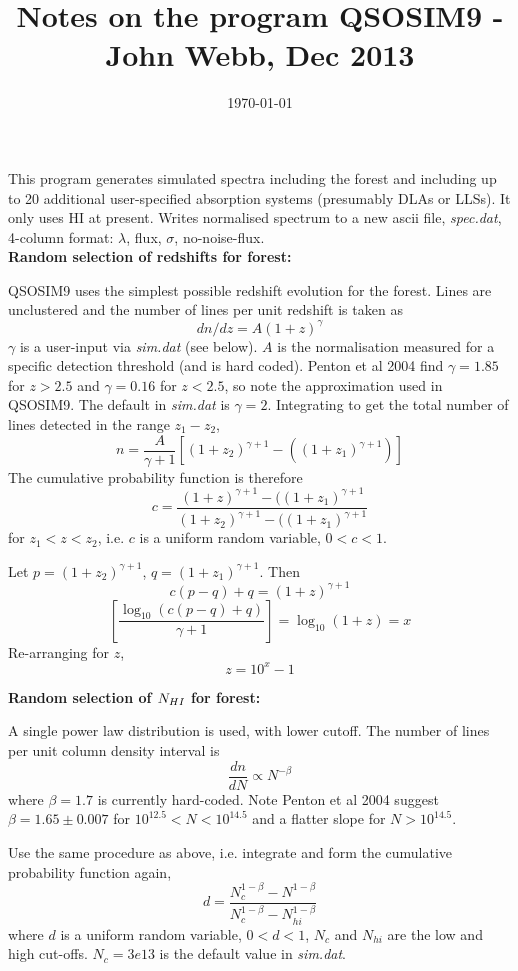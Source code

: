 \documentclass[a4paper,12pt]{article}
\begin{document}
 
\title{Notes on the program QSOSIM9 - John Webb, Dec 2013}
\date{\small {\today}}
\maketitle

This program generates simulated spectra including the forest and
including up to 20 additional user-specified absorption systems
(presumably DLAs or LLSs).  It only uses HI at present.
Writes normalised spectrum to a new ascii file,
{\it spec.dat}, 4-column format: $\lambda$, flux, $\sigma$, no-noise-flux.\\

{\bf Random selection of redshifts for forest:}

QSOSIM9 uses the simplest possible redshift evolution for the forest.  Lines 
are unclustered and the number of lines per unit redshift is taken as
\[
dn/dz = A(1+z)^{\gamma}
\]
$\gamma$ is a user-input via {\it sim.dat} (see below).  $A$ is the
normalisation measured for a specific detection threshold (and is hard coded).
Penton et al 2004 find $\gamma = 1.85$ for $z>2.5$ and $\gamma = 0.16$ for 
$z<2.5$, so note the approximation used in QSOSIM9.  The default in {\it sim.dat} 
is $\gamma = 2$.  Integrating to get the total number of lines detected in the 
range $z_1 - z_2$,
\[
n = \frac{A}{\gamma +1}\left[ (1+z_2)^{\gamma +1} - ((1+z_1)^{\gamma +1})\right]
\]
The cumulative probability function is therefore
\[
c = \frac{(1+z)^{\gamma +1} - ((1+z_1)^{\gamma +1}}{(1+z_2)^{\gamma +1} - 
((1+z_1)^{\gamma +1}} 
\]
for $z_1 < z < z_2$, i.e. $c$ is a uniform random variable, $0 < c < 1$.

Let $p = (1+z_2)^{\gamma +1}$, $q = (1+z_1)^{\gamma +1}$.  Then
\[
c(p-q)+q = (1+z)^{\gamma +1}
\]
\[
\left[ \frac{\log_{10}(c(p-q)+q)}{\gamma +1} \right] = \log_{10}(1+z) = x
\]
Re-arranging for $z$,
\[
z = 10^x -1
\]

{\bf Random selection of $\boldmath N_{HI}$ for forest:}

A single power law distribution is used, with lower cutoff.
The number of lines per unit column density interval is
\[
\frac{dn}{dN} \propto N^{-\beta}
\]
where $\beta = 1.7$ is currently hard-coded.
Note Penton et al 2004 suggest
$\beta = 1.65 \pm 0.007$ for $10^{12.5} < N < 10^{14.5}$ and a flatter 
slope for $N > 10^{14.5}$.

Use the same procedure as above, i.e.
integrate and form the cumulative probability function again,
\[
d = \frac{N_c^{1-\beta} - N^{1-\beta}}{N_c^{1-\beta} - N_{hi}^{1-\beta}}
\]
where $d$ is a uniform random variable, $0 < d < 1$,
$N_c$ and $N_{hi}$ are the low and high cut-offs.
$N_c = 3e13$ is the default value in {\it sim.dat}.
\end{document}
